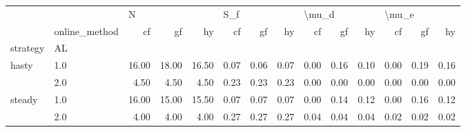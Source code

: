 \begin{tabular}{llrrrrrrrrrrrr}
\toprule
       & {} & \multicolumn{3}{l}{N} & \multicolumn{3}{l}{S\_f} & \multicolumn{3}{l}{\textbackslash mu\_d} & \multicolumn{3}{l}{\textbackslash mu\_e} \\
       & online\_method &    cf &    gf &    hy &   cf &   gf &   hy &    cf &   gf &   hy &    cf &   gf &   hy \\
strategy & AL &       &       &       &      &      &      &       &      &      &       &      &      \\
\midrule
hasty & 1.0 & 16.00 & 18.00 & 16.50 & 0.07 & 0.06 & 0.07 &  0.00 & 0.16 & 0.10 &  0.00 & 0.19 & 0.16 \\
       & 2.0 &  4.50 &  4.50 &  4.50 & 0.23 & 0.23 & 0.23 &  0.00 & 0.00 & 0.00 &  0.00 & 0.00 & 0.00 \\
steady & 1.0 & 16.00 & 15.00 & 15.50 & 0.07 & 0.07 & 0.07 &  0.00 & 0.14 & 0.12 &  0.00 & 0.16 & 0.12 \\
       & 2.0 &  4.00 &  4.00 &  4.00 & 0.27 & 0.27 & 0.27 &  0.04 & 0.04 & 0.04 &  0.02 & 0.02 & 0.02 \\
\bottomrule
\end{tabular}
